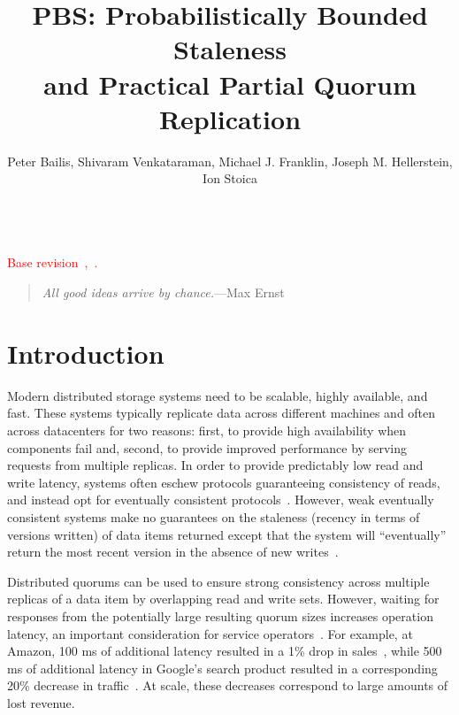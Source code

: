 \documentclass{vldb}
\title{PBS: Probabilistically Bounded Staleness\\ and Practical Partial Quorum Replication}
\author{Peter Bailis, Shivaram Venkataraman, Michael J. Franklin, Joseph M. Hellerstein, Ion Stoica\\
\affaddr{University of California, Berkeley}\\
\affaddr{\{pbailis, shivaram, franklin, hellerstein, istoica\}@cs.berkeley.edu}}
\newcommand{\sectionskip}{-0em}
\begin{document}

\maketitle


\textcolor{red}{Base revision~\GITAbrHash,~\GITAuthorDate.\\[-2em]}

\begin{quote}
\textit{All good ideas arrive by chance.}---Max Ernst
\end{quote}



\vspace{\sectionskip}\section{Introduction}

Modern distributed storage systems need to be scalable, highly
available, and fast.  These systems typically replicate data across
different machines and often across datacenters for two reasons:
first, to provide high availability when components fail and, second,
to provide improved performance by serving requests from multiple
replicas.  In order to provide predictably low read and write latency,
systems often eschew protocols guaranteeing consistency of reads, and
instead opt for eventually consistent
protocols~\cite{cassandradefault, abadilatconsist, dynamo, feinbergpc,
  reddit, riaktalkone, outbrain}.  However, weak eventually consistent
systems make no guarantees on the staleness (recency in terms of
versions written) of data items returned except that the system will
``eventually'' return the most recent version in the absence of new
writes~\cite{vogels-defs}.

Distributed quorums can be used to ensure strong consistency across
multiple replicas of a data item by overlapping read and write
sets. However, waiting for responses from the potentially large
resulting quorum sizes increases operation latency, an important
consideration for service operators~\cite{perf-impact}. For example, at Amazon, 100 ms of
additional latency resulted in a 1\% drop in
sales~\cite{amazon-latency}, while 500 ms of additional latency in
Google's search product resulted in a corresponding 20\% decrease in
traffic~\cite{google-talk}.  At scale, these decreases correspond to
large amounts of lost revenue.
\end{document}
